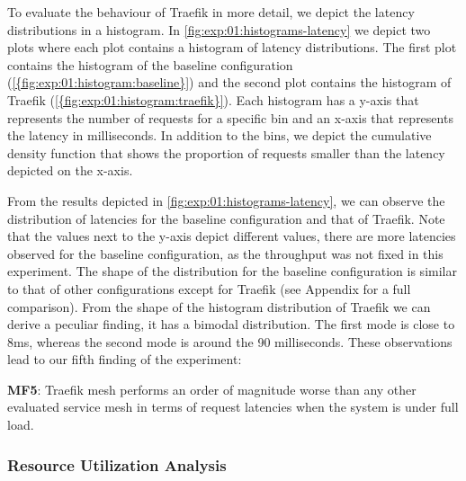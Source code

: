 To evaluate the behaviour of Traefik in more detail, we depict the latency distributions in a histogram. In \cref{fig:exp:01:histograms-latency} we depict two plots where each plot contains a histogram of latency distributions. The first plot contains the histogram of the baseline configuration (\cref{{fig:exp:01:histogram:baseline}}) and the second plot contains the histogram of Traefik  (\cref{{fig:exp:01:histogram:traefik}}). Each histogram has a y-axis that represents the number of requests for a specific bin and an x-axis that represents the latency in milliseconds. In addition to the bins, we depict the cumulative density function that shows the proportion of requests smaller than the latency depicted on the x-axis. 

From the results depicted in \cref{fig:exp:01:histograms-latency}, we can observe the distribution of latencies for the baseline configuration and that of Traefik. Note that the values next to the y-axis depict different values, there are more latencies observed for the baseline configuration, as the throughput was not fixed in this experiment. The shape of the distribution for the baseline configuration is similar to that of other configurations except for Traefik (see Appendix for a full comparison). From the shape of the histogram distribution of Traefik we can derive a peculiar finding, it has a bimodal distribution. The first mode is close to 8ms, whereas the second mode is around the 90 milliseconds. These observations lead to our fifth  finding of the experiment: 

\begin{shaded*}
    \noindent
    \textbf{MF5}: 
    Traefik mesh performs an order of magnitude worse than any other evaluated service mesh in terms of request latencies when the system is under full load.
\end{shaded*}

\subsubsection{Resource Utilization Analysis}
\label{sec:experiments:results:per-experiment:01:resource}


